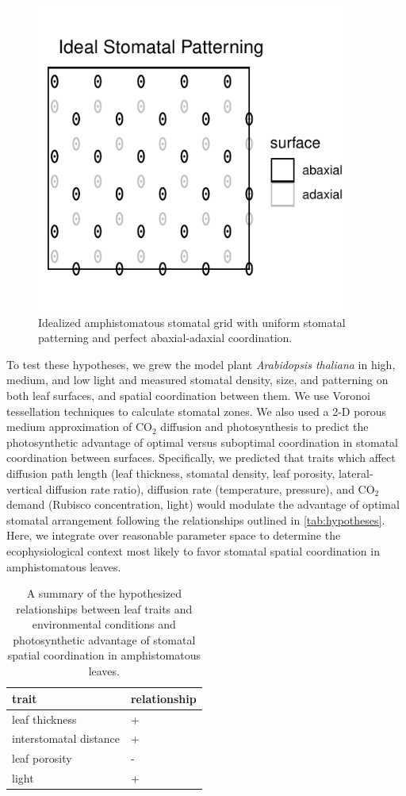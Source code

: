 \documentclass[webpdf,large,modern,unnumsec,namedate]{oup-authoring-template}
\begin{document}
\begin{figure}[ht]
\includegraphics[width = 4in]{figures/ideal-amphi-grid.pdf}
\caption{Idealized amphistomatous stomatal grid with uniform stomatal patterning and perfect abaxial-adaxial coordination.}
\label{fig:ideal-amphi-grid}
\end{figure}

To test these hypotheses, we grew the model plant \emph{Arabidopsis
thaliana} in high, medium, and low light and measured stomatal density,
size, and patterning on both leaf surfaces, and spatial coordination
between them. We use Voronoi tessellation techniques to calculate
stomatal zones. We also used a 2-D porous medium approximation of
CO\(_2\) diffusion and photosynthesis to predict the photosynthetic
advantage of optimal versus suboptimal coordination in stomatal
coordination between surfaces. Specifically, we predicted that traits
which affect diffusion path length (leaf thickness, stomatal density,
leaf porosity, lateral-vertical diffusion rate ratio), diffusion rate
(temperature, pressure), and CO\(_2\) demand (Rubisco concentration,
light) would modulate the advantage of optimal stomatal arrangement
following the relationships outlined in \autoref{tab:hypotheses}. Here,
we integrate over reasonable parameter space to determine the
ecophysiological context most likely to favor stomatal spatial
coordination in amphistomatous leaves.

\begin{table}[ht]
\centering
\begin{tabular}{ll}
  \hline
trait & relationship \\ 
  \hline
leaf thickness & + \\ 
  interstomatal distance & + \\ 
  leaf porosity & - \\ 
  light & + \\ 
   \hline
\end{tabular}
\caption{A summary of the hypothesized relationships between leaf traits and environmental conditions and photosynthetic advantage of stomatal spatial coordination in amphistomatous leaves.} 
\label{tab:hypotheses}
\end{table}
\end{document}
